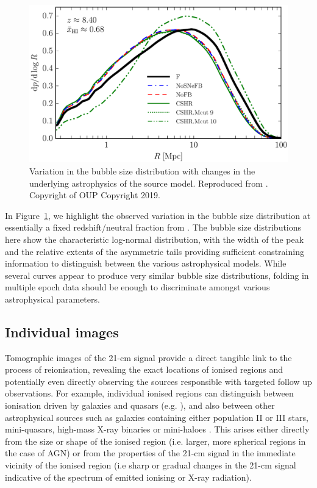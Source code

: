 \begin{figure}[]
\begin{center}
\includegraphics[trim = 0.2cm 1cm 0.2cm 0.2cm, scale = 0.45]{Greig/BSDVariation}
\end{center}
\caption{Variation in the bubble size distribution with changes in the underlying astrophysics of the source model. Reproduced from \cite{Geil:2016}. Copyright of OUP Copyright 2019.}
\label{fig:BSD}
\end{figure}

In Figure~\ref{fig:BSD}, we highlight the observed variation in the bubble size distribution at essentially a fixed redshift/neutral fraction from \cite{Geil:2016}. The bubble size distributions here show the characteristic log-normal distribution, with the width of the peak and the relative extents of the asymmetric tails providing sufficient constraining information to distinguish between the various astrophysical models. While several curves appear to produce very similar bubble size distributions, folding in multiple epoch data should be enough to discriminate amongst various astrophysical parameters.

\subsection{Individual images}

Tomographic images of the 21-cm signal provide a direct tangible link to the process of reionisation, revealing the exact locations of ionised regions and potentially even directly observing the sources responsible with targeted follow up observations. For example, individual ionised regions can distinguish between ionisation driven by galaxies and quasars (e.g. \cite{Datta:2012,Majumdar:2012}), and also between other astrophysical sources such as galaxies containing either population II or III stars, mini-quasars, high-mass X-ray binaries or mini-haloes \cite{Ghara:2016,Ghara:2017}. This arises either directly from the size or shape of the ionised region (i.e. larger, more spherical regions in the case of AGN) or from the properties of the 21-cm signal in the immediate vicinity of the ionised region (i.e sharp or gradual changes in the 21-cm signal indicative of the spectrum of emitted ionising or X-ray radiation).

